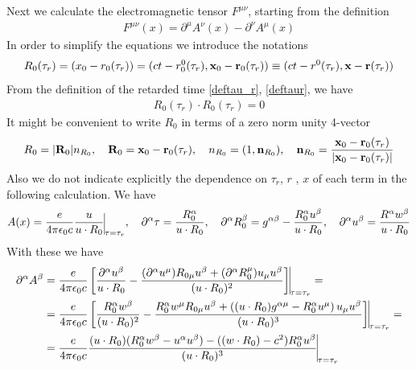 Next we calculate the electromagnetic tensor $F^{\mu\nu}$, starting from the definition
\begin{align}
    F^{\mu\nu}(x)=\partial^{\mu}A^{\nu}(x)-\partial^{\nu}A^{\mu}(x)\label{def-F-rad}
\end{align}
In order to simplify the equations we introduce the notations
\begin{align}
    R_0(\tau_r)=(x_0-r_0(\tau_r)) = (ct - r_0^0(\tau_r), {\bf x}_0-{\bf r}_0(\tau_r))\equiv (ct - r^0(\tau_r), {\bf x}-{\bf r}(\tau_r))\label{def_{R_0}}
\end{align}
From the definition of the retarded time
\ref{deftau_r}, \ref{deftaur}, we have
\begin{align}
    R_0(\tau_r)\cdot R_0(\tau_r)=0
\end{align}
It might be convenient to write $R_0$ in terms of a zero norm unity 4-vector
\begin{align}
    R_0=|{\bf R}_0|n_{R_0},\quad {\bf R}_0={\bf x}_0-{\bf r}_0(\tau_r),\quad n_{R_0}=(1,{\bf n}_{R_0}),\quad {\bf n}_{R_0}=\frac{{\bf x}_0-{\bf r}_0(\tau_r)}{|{\bf x}_0-{\bf r}_0(\tau_r)|}\label{defnr}
\end{align}
Also we do not indicate explicitly the dependence on $\tau_r$, $r$ , $x$ of each term in the following calculation.
We have
\begin{align}
    A(x)={\frac{e}{4\pi\epsilon_0c}\frac{u}{u\cdot R_0}\vline}_{\tau=\tau_r},\quad \partial^{\alpha} \tau=\frac{R_0^{\alpha}}{u\cdot R_0},\quad \partial^{\alpha}R_0^{\beta}=g^{\alpha\beta}-\frac{R_0^{\alpha}u^{\beta}}{u\cdot R_0},\quad \partial^{\alpha} u^{\beta}=\frac{R^{\alpha}w^{\beta}}{u\cdot R_0}
\end{align}
With these we have
\begin{align}
    \partial^{\alpha}A^{\beta} & ={\frac{e}{4\pi\epsilon_0c}\left[\frac{\partial^{\alpha}u^{\beta}}{u\cdot R_0}-\frac{(\partial^{\alpha}u^{\mu})R_{0\mu}u^{\beta}+(\partial^{\alpha}R_0^{\mu})u_{\mu}u^{\beta}}{(u\cdot R_0)^2}\right]\vline}_{\tau=\tau_r}=\nonumber                       \\
                               & ={\frac{e}{4\pi\epsilon_0c}\left[\frac{R_0^{\alpha}w^{\beta}}{(u\cdot R_0)^2}-\frac{R_0^{\alpha}w^{\mu}R_{0\mu}u^{\beta}+\left((u\cdot R_0)g^{\alpha\mu}-R_0^{\alpha}u^{\mu}\right)u_{\mu}u^{\beta}}{(u\cdot R_0)^3}\right]\vline}_{\tau=\tau_r}=\nonumber \\
                               & ={\frac{e}{4\pi\epsilon_0c}\frac{(u\cdot R_0)(R_0^{\alpha}w^{\beta}-u^{\alpha}u^{\beta})-((w\cdot R_0)-c^2)R_0^{\alpha}u^{\beta}}{(u\cdot R_0)^3}	\vline}_{\tau=\tau_r}
\end{align}
